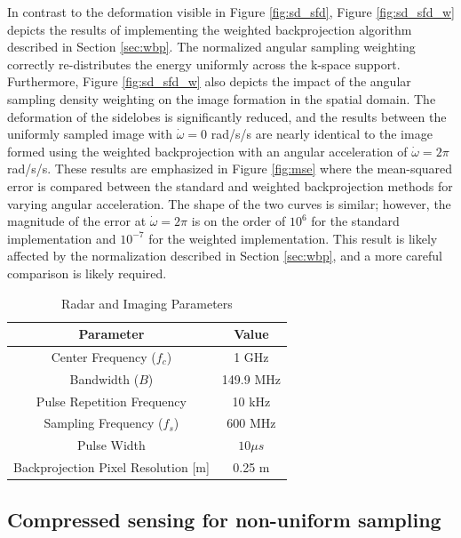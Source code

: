 \documentclass[conference]{IEEEtran}
\begin{document}
In contrast to the deformation visible in Figure \ref{fig:sd_sfd}, Figure \ref{fig:sd_sfd_w} depicts the results of implementing the weighted backprojection algorithm described in Section \ref{sec:wbp}. The normalized angular sampling weighting correctly re-distributes the energy uniformly across the k-space support. Furthermore, Figure \ref{fig:sd_sfd_w} also depicts the impact of the angular sampling density weighting on the image formation in the spatial domain. The deformation of the sidelobes is significantly reduced, and the results between the uniformly sampled image with $\dot{\omega} = 0$ rad/s/s are nearly identical to the image formed using the weighted backprojection with an angular acceleration of $\dot{\omega} = 2\pi$ rad/s/s. These results are emphasized in Figure \ref{fig:mse} where the mean-squared error is compared between the standard and weighted backprojection methods for varying angular acceleration. The shape of the two curves is similar; however, the magnitude of the error at $\dot{\omega} = 2\pi$ is on the order of $10^{6}$ for the standard implementation and $10^{-7}$ for the weighted implementation. This result is likely affected by the normalization described in Section \ref{sec:wbp}, and a more careful comparison is likely required.

\begin{table}[]
    \centering
    \begin{tabular}{|c|c|}
        \hline
        Parameter & Value \\ \hline 
        Center Frequency ($f_{c}$) & 1 GHz\\ \hline 
        Bandwidth ($B$) & 149.9 MHz \\ \hline
        Pulse Repetition Frequency & 10 kHz \\ \hline
        Sampling Frequency ($f_{s}$) & 600 MHz \\ \hline
        Pulse Width & $10 \mu s$ \\ \hline
        Backprojection Pixel Resolution [m] & 0.25 m \\ \hline
    \end{tabular}
    \caption{Radar and Imaging Parameters}
    \label{tab:radar}
\end{table}

\subsection{Compressed sensing for non-uniform sampling}
\end{document}
